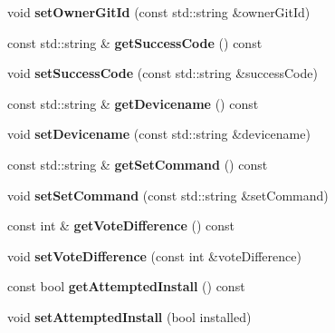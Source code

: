 \begin{DoxyCompactItemize}
\mbox{\label{classDevice_aabc16749d0fe22ec25ca525fbd2b9dc2}} 
void {\bfseries set\+Owner\+Git\+Id} (const std\+::string \&owner\+Git\+Id)
\item 
\mbox{\label{classDevice_a19c62e8fa746efc12e6c0521b690bf03}} 
const std\+::string \& {\bfseries get\+Success\+Code} () const
\item 
\mbox{\label{classDevice_ae70b727a6230454baccc6da6cfd819a7}} 
void {\bfseries set\+Success\+Code} (const std\+::string \&success\+Code)
\item 
\mbox{\label{classDevice_a7c1221950b9ec064b023c4033454774a}} 
const std\+::string \& {\bfseries get\+Devicename} () const
\item 
\mbox{\label{classDevice_ad1f6005dcab32855477814fa9533315d}} 
void {\bfseries set\+Devicename} (const std\+::string \&devicename)
\item 
\mbox{\label{classDevice_a3c0a93766217f57848cf6871aeb9ffc2}} 
const std\+::string \& {\bfseries get\+Set\+Command} () const
\item 
\mbox{\label{classDevice_afad48633a288b303f88f7d607c64cca3}} 
void {\bfseries set\+Set\+Command} (const std\+::string \&set\+Command)
\item 
\mbox{\label{classDevice_abbf7d73cde4dc08996414956fc25188d}} 
const int \& {\bfseries get\+Vote\+Difference} () const
\item 
\mbox{\label{classDevice_acf378aa086771dd7c64626abb8a74821}} 
void {\bfseries set\+Vote\+Difference} (const int \&vote\+Difference)
\item 
\mbox{\label{classDevice_a068c25d48712783fd0dc759d4505c615}} 
const bool {\bfseries get\+Attempted\+Install} () const
\item 
\mbox{\label{classDevice_af2591540bf77d38b8e4c09b90e8dfaba}} 
void {\bfseries set\+Attempted\+Install} (bool installed)
\item 
\mbox{\label{classDevice_ad49afa64f231ac899736cc21027766f2}} 

\end{DoxyCompactItemize}
